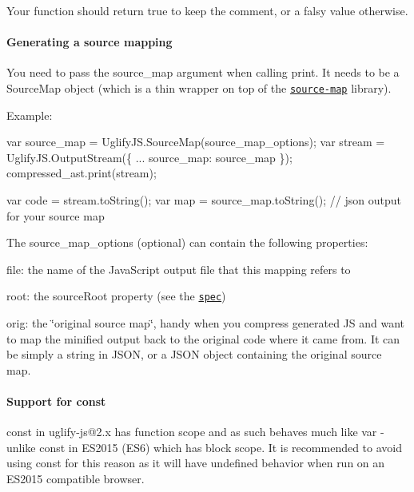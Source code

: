 Your function should return {\ttfamily true} to keep the comment, or a falsy value otherwise.

\paragraph*{Generating a source mapping}

You need to pass the {\ttfamily source\+\_\+map} argument when calling {\ttfamily print}. It needs to be a {\ttfamily Source\+Map} object (which is a thin wrapper on top of the \href{https://github.com/mozilla/source-map}{\tt source-\/map} library).

Example\+: 
\begin{DoxyCode}
var source\_map = UglifyJS.SourceMap(source\_map\_options);
var stream = UglifyJS.OutputStream(\{
    ...
    source\_map: source\_map
\});
compressed\_ast.print(stream);

var code = stream.toString();
var map = source\_map.toString(); // json output for your source map
\end{DoxyCode}


The {\ttfamily source\+\_\+map\+\_\+options} (optional) can contain the following properties\+:


\begin{DoxyItemize}
\item {\ttfamily file}\+: the name of the Java\+Script output file that this mapping refers to
\item {\ttfamily root}\+: the {\ttfamily source\+Root} property (see the \href{https://docs.google.com/document/d/1U1RGAehQwRypUTovF1KRlpiOFze0b-_2gc6fAH0KY0k/edit}{\tt spec})
\item {\ttfamily orig}\+: the \char`\"{}original source map\char`\"{}, handy when you compress generated JS and want to map the minified output back to the original code where it came from. It can be simply a string in J\+S\+ON, or a J\+S\+ON object containing the original source map.
\end{DoxyItemize}

\paragraph*{Support for {\ttfamily const}}

{\ttfamily const} in {\ttfamily uglify-\/js@2.\+x} has function scope and as such behaves much like {\ttfamily var} -\/ unlike {\ttfamily const} in E\+S2015 (E\+S6) which has block scope. It is recommended to avoid using {\ttfamily const} for this reason as it will have undefined behavior when run on an E\+S2015 compatible browser. 